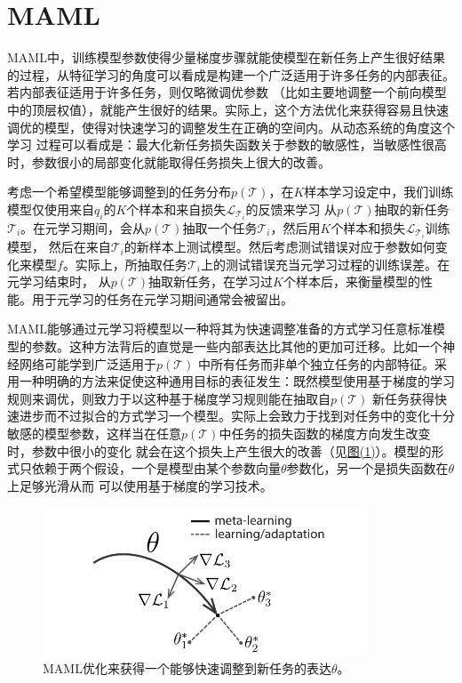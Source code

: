 \documentclass[11pt,twoside,a4paper]{ctexart}
\begin{document}
\section{MAML}
MAML中，训练模型参数使得少量梯度步骤就能使模型在新任务上产生很好结果的过程，从特征学习的角度可以看成是构建一个广泛适用于许多任务的内部表征。若内部表征适用于许多任务，则仅略微调优参数
（比如主要地调整一个前向模型中的顶层权值），就能产生很好的结果。实际上，这个方法优化来获得容易且快速调优的模型，使得对快速学习的调整发生在正确的空间内。从动态系统的角度这个学习
过程可以看成是：最大化新任务损失函数关于参数的敏感性，当敏感性很高时，参数很小的局部变化就能取得任务损失上很大的改善。

考虑一个希望模型能够调整到的任务分布$p(\mathcal T)$，在$K$样本学习设定中，我们训练模型仅使用来自$q_i$的$K$个样本和来自损失$\mathcal L_{\mathcal T_i}$的反馈来学习
从$p(\mathcal T)$抽取的新任务$\mathcal T_i$。在元学习期间，会从$p(\mathcal T)$抽取一个任务$\mathcal T_i$，然后用$K$个样本和损失$\mathcal L_{\mathcal T_i}$训练模型，
然后在来自$\mathcal T_i$的新样本上测试模型。然后考虑测试错误对应于参数如何变化来模型$f$。实际上，所抽取任务$\mathcal T_i$上的测试错误充当元学习过程的训练误差。在元学习结束时，
从$p(\mathcal T)$抽取新任务，在学习过$K$个样本后，来衡量模型的性能。用于元学习的任务在元学习期间通常会被留出。

MAML能够通过元学习将模型以一种将其为快速调整准备的方式学习任意标准模型的参数。这种方法背后的直觉是一些内部表达比其他的更加可迁移。比如一个神经网络可能学到广泛适用于$p(\mathcal T)$
中所有任务而非单个独立任务的内部特征。采用一种明确的方法来促使这种通用目标的表征发生：既然模型使用基于梯度的学习规则来调优，则致力于以这种基于梯度学习规则能在抽取自$p(\mathcal T)$
新任务获得快速进步而不过拟合的方式学习一个模型。实际上会致力于找到对任务中的变化十分敏感的模型参数，这样当在任意$p(\mathcal T)$中任务的损失函数的梯度方向发生改变时，参数中很小的变化
就会在这个损失上产生很大的改善（见\hyperref[fig1]{图(\ref{fig1})}）。模型的形式只依赖于两个假设，一个是模型由某个参数向量$\theta$参数化，另一个是损失函数在$\theta$上足够光滑从而
可以使用基于梯度的学习技术。

\begin{figure}[htbp]
	\includegraphics[height=125pt]{fig1}
	\caption{MAML优化来获得一个能够快速调整到新任务的表达$\theta$。}
	\label{fig1}
\end{figure}
\end{document}

